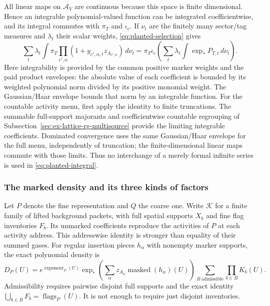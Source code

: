 All linear maps on $\mathscr A_V$ are continuous because this space is
finite dimensional. Hence an integrable polynomial-valued function can
be integrated coefficientwise, and its integral commutes with $\pi_T$
and $\iota_c$. If $\nu_t$ are the finitely many sector/tag measures and
$\lambda_t$ their scalar weights, \eqref{eq:planted-selection} gives
\begin{equation}\label{eq:planted-integral}
 \sum_t\lambda_t\int
       \pi_T\prod_{c',\alpha}(1+y_{c',\alpha,t}z_{A_{c',\alpha}})
          \,d\nu_t
 =\pi_T\iota_c\left(\sum_t\lambda_t\int\exp_*P_{T,t}\,d\nu_t\right).
\end{equation}
Here integrability is provided by the common positive marker weights
and the paid product envelopes: the absolute value of each coefficient
is bounded by its weighted polynomial norm divided by its positive
monomial weight. The Gaussian/Haar envelope bounds that norm by an
integrable function. For the countable activity menu, first apply the
identity to finite truncations. The summable full-support majorants and
coefficientwise countable regrouping of
Subsection~\ref{sec:ex-lattice-rg-multisource} provide the limiting
integrable coefficients. Dominated convergence uses the same Gaussian/Haar
envelope for the full menu, independently of truncation; the
finite-dimensional linear maps commute with those limits. Thus no interchange of a merely formal infinite series is
used in \eqref{eq:planted-integral}.

\subsubsection{The marked density and its three kinds of factors}

Let $P$ denote the fine representation and $Q$ the coarse one. Write
$\mathcal K$ for a finite family of lifted background packets, with
full spatial supports $X_b$ and fine flag inventories $F_b$. Its
unmarked coefficients reproduce the activities of $P$ at each activity
address. This addresswise identity is stronger than equality of their
summed gases. For regular insertion pieces $h_\alpha$ with nonempty
marker supports, the exact polynomial density is
\begin{equation}\label{eq:planted-density}
 D_P(U)=e^{\operatorname{exponent}_P(U)}
    \exp_*\left(\sum_\alpha z_{A_\alpha}
                    \operatorname{masked}(h_\alpha)(U)\right)
    \sum_{B\ \text{admissible}}\prod_{b\in B}K_b(U).
\end{equation}
Admissibility requires pairwise disjoint full supports and the exact
identity $\bigcup_{b\in B}F_b=\operatorname{flags}_P(U)$.
It is not enough to require just disjoint inventories.

